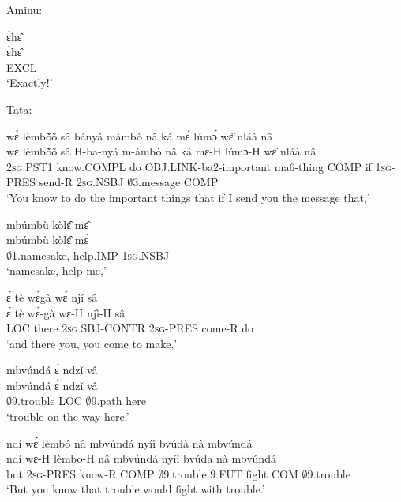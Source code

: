 \noindent Aminu:

\begin{exe} 
\exN\label{227}
  \glll ɛ̀hɛ̂ \\
       ɛ̀hɛ̂ \\
        EXCL  \\
    \trans `Exactly!'
\end{exe}

\noindent Tata:

\begin{exe} 
\exN\label{228}
  \glll wɛ̀ lèmbṍõ̀ sâ bányá màmbò nâ ká mɛ́ lúmɔ́ wɛ̂ nláà nâ \\
       wɛ lèmbṍõ̀ sâ H-ba-nyá m-àmbò nâ ká mɛ-H lúmɔ-H wɛ̂ nláà nâ \\
        2\textsc{sg}.PST1 know.COMPL  do OBJ.LINK-ba2-important ma6-thing COMP if 1\textsc{sg}-PRES send-R 2\textsc{sg}.NSBJ $\emptyset$3.message COMP \\
    \trans `You know to do the important things that if I send you the message that,'
\end{exe}

\begin{exe} 
\exN\label{229}
  \glll mbúmbù kòlɛ̂ mɛ̂ \\
       mbúmbù kòlɛ̂ mɛ̀ \\
         $\emptyset$1.namesake, help.IMP 1\textsc{sg}.NSBJ \\
    \trans `namesake, help me,'
\end{exe}

\begin{exe} 
\exN\label{230}
  \glll ɛ́ tè wɛ̀gà wɛ́ njí sâ \\
        ɛ́ tè wɛ̀-gà wɛ-H njì-H sâ \\
        LOC there 2\textsc{sg}.SBJ-CONTR 2\textsc{sg}-PRES come-R do  \\
    \trans `and there you, you come to make,'
\end{exe}

\begin{exe} 
\exN\label{231}
  \glll mbvúndá ɛ́ ndzǐ vâ \\
       mbvúndá ɛ́ ndzǐ vâ \\
        $\emptyset$9.trouble LOC $\emptyset$9.path here  \\
    \trans `trouble on the way here.'
\end{exe}

\begin{exe} 
\exN\label{232} 
  \glll ndí wɛ́ lèmbó nâ mbvúndá nyíì bvúdà nà mbvúndá\\
        ndí wɛ-H lèmbo-H nâ mbvúndá nyíì bvúda nà mbvúndá\\
         but 2\textsc{sg}-PRES know-R COMP $\emptyset$9.trouble 9.FUT fight COM $\emptyset$9.trouble\\
    \trans `But you know that trouble would fight with trouble.'
\end{exe}

